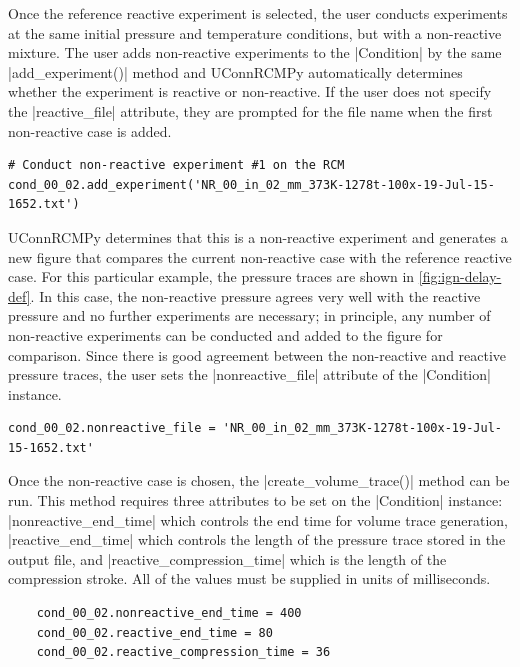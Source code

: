 \documentclass[12pt]{../ussci}
\begin{document}
Once the reference reactive experiment is selected, the user conducts
experiments at the same initial pressure and temperature conditions, but with a
non-reactive mixture. The user adds non-reactive experiments to the
\python|Condition| by the same \python|add_experiment()| method and UConnRCMPy
automatically determines whether the experiment is reactive or non-reactive. If
the user does not specify the \python|reactive_file| attribute, they are
prompted for the file name when the first non-reactive case is added.

\begin{verbatim}
# Conduct non-reactive experiment #1 on the RCM
cond_00_02.add_experiment('NR_00_in_02_mm_373K-1278t-100x-19-Jul-15-1652.txt')
\end{verbatim}

UConnRCMPy determines that this is a non-reactive experiment and generates a new
figure that compares the current non-reactive case with the reference reactive
case. For this particular example, the pressure traces are shown in
\cref{fig:ign-delay-def}. In this case, the non-reactive pressure agrees very
well with the reactive pressure and no further experiments are necessary; in
principle, any number of non-reactive experiments can be conducted and added to
the figure for comparison. Since there is good agreement between the
non-reactive and reactive pressure traces, the user sets the
\python|nonreactive_file| attribute of the \python|Condition| instance.

\begin{verbatim}
cond_00_02.nonreactive_file = 'NR_00_in_02_mm_373K-1278t-100x-19-Jul-15-1652.txt'
\end{verbatim}

Once the non-reactive case is chosen, the \python|create_volume_trace()| method
can be run. This method requires three attributes to be set on the
\python|Condition| instance: \python|nonreactive_end_time| which controls the
end time for volume trace generation, \python|reactive_end_time| which controls
the length of the pressure trace stored in the output file, and
\python|reactive_compression_time| which is the length of the compression
stroke. All of the values must be supplied in units of milliseconds.

\begin{verbatim}
    cond_00_02.nonreactive_end_time = 400
    cond_00_02.reactive_end_time = 80
    cond_00_02.reactive_compression_time = 36
\end{verbatim}
\end{document}
